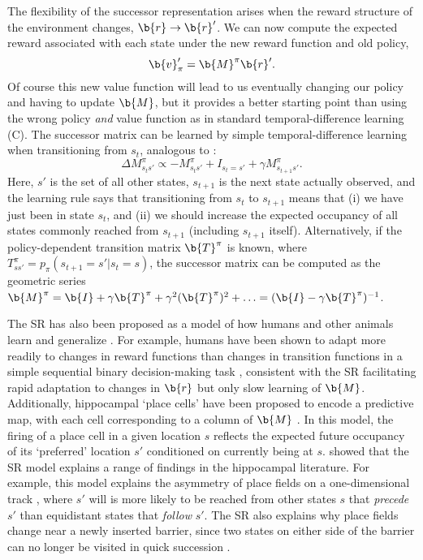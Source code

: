 The flexibility of the successor representation arises when the reward structure of the environment changes, $\b{r} \rightarrow \b{r}'$.
We can now compute the expected reward associated with each state under the new reward function and old policy,
\begin{equation}
    \b{v}_\pi' = \b{M}^\pi \b{r}'.
\end{equation}
Of course this new value function will lead to us eventually changing our policy and having to update $\b{M}$, but it provides a better starting point than using the wrong policy \emph{and} value function as in standard temporal-difference learning (C).
The successor matrix can be learned by simple temporal-difference learning when transitioning from $s_t$, analogous to :
\begin{equation}
    \Delta M^\pi_{s_t s'} \propto -M^\pi_{s_t s'} + I_{s_t = s'} + \gamma M^\pi_{s_{t+1} s'}.
\end{equation}
Here, ${s'}$ is the set of all other states, $s_{t+1}$ is the next state actually observed, and the learning rule says that transitioning from $s_t$ to $s_{t+1}$ means that (i) we have just been in state $s_t$, and (ii) we should increase the expected occupancy of all states commonly reached from $s_{t+1}$ (including $s_{t+1}$ itself).
Alternatively, if the policy-dependent transition matrix $\b{T}^\pi$ is known, where $T^\pi_{s s'} = p_{\pi}(s_{t+1} = s' | s_t = s)$, the successor matrix can be computed as the geometric series $\b{M}^\pi = \b{I} + \gamma \b{T}^\pi + \gamma^2 (\b{T}^\pi)^2 + \ldots = (\b{I} - \gamma \b{T}^\pi)^{-1}$.

The SR has also been proposed as a model of how humans and other animals learn and generalize \citep{momennejad2017successor, stachenfeld2017hippocampus, geerts2020general,gershman2018successor}.
For example, humans have been shown to adapt more readily to changes in reward functions than changes in transition functions in a simple sequential binary decision-making task \citep{momennejad2017successor}, consistent with the SR facilitating rapid adaptation to changes in $\b{r}$ but only slow learning of $\b{M}$.
Additionally, hippocampal `place cells' have been proposed to encode a predictive map, with each cell corresponding to a column of $\b{M}$ \citep{stachenfeld2017hippocampus}.
In this model, the firing of a place cell in a given location $s$ reflects the expected future occupancy of its `preferred' location $s'$ conditioned on currently being at $s$.
\citet{stachenfeld2017hippocampus} showed that the SR model explains a range of findings in the hippocampal literature.
For example, this model explains the asymmetry of place fields on a one-dimensional track \citep{mehta2000experience}, where $s'$ will is more likely to be reached from other states $s$ that \emph{precede} $s'$ than equidistant states that \emph{follow} $s'$.
The SR also explains why place fields change near a newly inserted barrier, since two states on either side of the barrier can no longer be visited in quick succession \citep{alvernhe2011local}.

